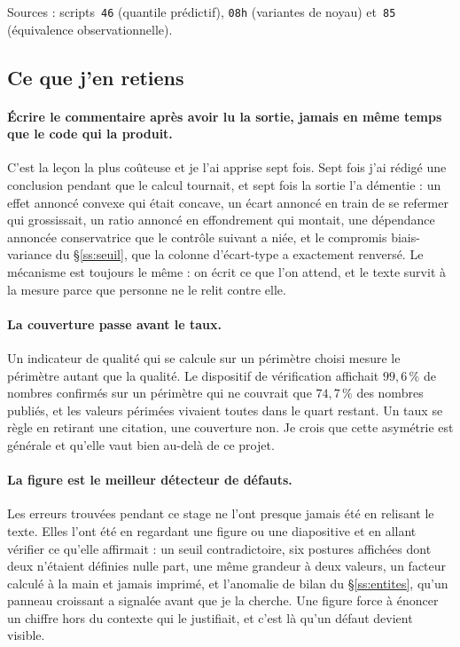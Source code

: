 \documentclass[12pt,a4paper]{article}
\theoremstyle{definition}
\begin{document}
\vspace{4pt}
\noindent Sources : scripts~\texttt{46} (quantile prédictif), \texttt{08h}
(variantes de noyau) et~\texttt{85} (équivalence observationnelle).

\subsection{Ce que j'en retiens}
\label{ss:retiens}


\paragraph{Écrire le commentaire après avoir lu la sortie, jamais en même temps que
le code qui la produit.} C'est la leçon la plus coûteuse et je l'ai apprise sept
fois. Sept fois j'ai rédigé une conclusion pendant que le calcul tournait, et sept
fois la sortie l'a démentie : un effet annoncé convexe qui était concave, un écart
annoncé en train de se refermer qui grossissait, un ratio annoncé en effondrement
qui montait, une dépendance annoncée conservatrice que le contrôle suivant a niée,
et le compromis biais-variance du \S\ref{ss:seuil}, que la colonne d'écart-type a
exactement renversé. Le mécanisme est toujours le même : on écrit ce que l'on
attend, et le texte survit à la mesure parce que personne ne le relit contre elle.

\paragraph{La couverture passe avant le taux.} Un indicateur de qualité qui se
calcule sur un périmètre choisi mesure le périmètre autant que la qualité. Le
dispositif de vérification affichait $99{,}6\,\%$ de nombres confirmés sur un
périmètre qui ne couvrait que $74{,}7\,\%$ des nombres publiés, et les valeurs
périmées vivaient toutes dans le quart restant. Un taux se règle en retirant une
citation, une couverture non. Je crois que cette asymétrie est générale et qu'elle
vaut bien au-delà de ce projet.

\paragraph{La figure est le meilleur détecteur de défauts.} Les erreurs trouvées
pendant ce stage ne l'ont presque jamais été en relisant le texte. Elles l'ont été
en regardant une figure ou une diapositive et en allant vérifier ce qu'elle
affirmait : un seuil contradictoire, six postures affichées dont deux n'étaient
définies nulle part, une même grandeur à deux valeurs, un facteur calculé à la main
et jamais imprimé, et l'anomalie de bilan du \S\ref{ss:entites}, qu'un panneau
croissant a signalée avant que je la cherche. Une figure force à énoncer un chiffre
hors du contexte qui le justifiait, et c'est là qu'un défaut devient visible.
\end{document}
